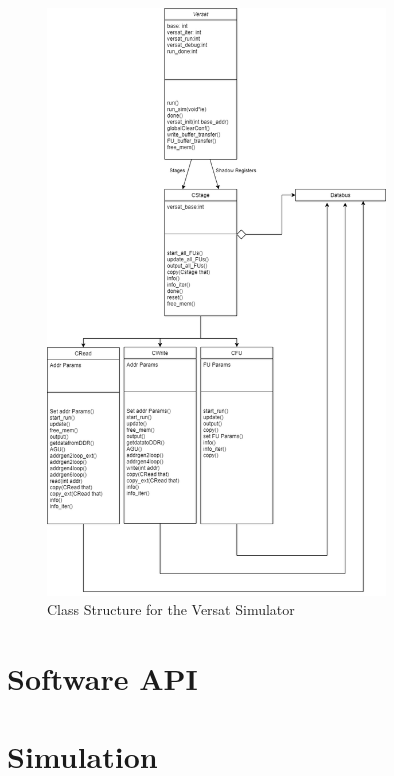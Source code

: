 \begin{figure}[!htbp]
    \centering
    \includegraphics[width=0.8\textwidth]{Figures/VersatSimulatorDraw.drawio.png}
    \caption{Class Structure for the Versat Simulator}
    \label{figure:VersatSimulatorClass}
\end{figure} 


\section{Software API}


\section{Simulation}


